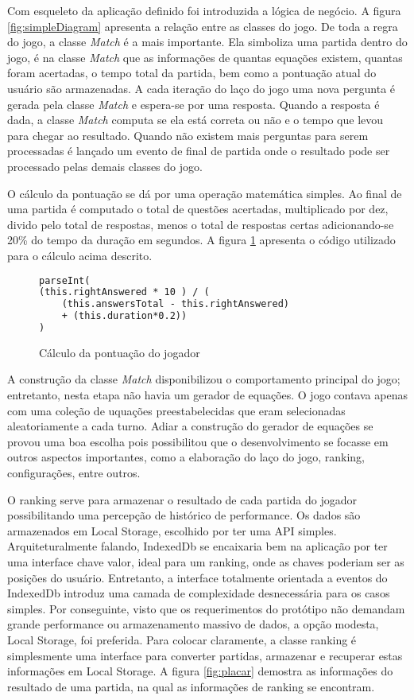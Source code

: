 Com esqueleto da aplicação definido foi introduzida a lógica
de negócio. A figura \ref{fig:simpleDiagram} apresenta a
relação entre as classes do jogo. De toda a regra do jogo, a classe
\textit{Match} é a mais importante. Ela simboliza uma partida dentro
do jogo, é na classe \textit{Match} que as informações de quantas
equações existem, quantas foram acertadas, o tempo total da partida,
bem como a pontuação atual do usuário são armazenadas. A cada
iteração do laço do jogo uma nova pergunta é gerada pela classe
\textit{Match} e espera-se por uma resposta. Quando a resposta é dada,
a classe \textit{Match} computa se ela está correta ou não e
o tempo que levou para chegar ao resultado. Quando não existem mais
perguntas para serem processadas é lançado um evento de final de
partida onde o resultado pode ser processado pelas demais classes do
jogo.

O cálculo da pontuação se dá por uma operação matemática simples.
Ao final de uma partida é computado o total de questões acertadas,
multiplicado por dez, divido pelo total de respostas, menos o total de
respostas certas adicionando-se 20\% do tempo da duração em segundos.
A figura \ref{fig:punctuationCalculation} apresenta o código utilizado
para o cálculo acima descrito.

\begin{figure}[H]
\centering
\begin{lstlisting}[language=html,frame=single]
parseInt(
(this.rightAnswered * 10 ) / (
    (this.answersTotal - this.rightAnswered) 
    + (this.duration*0.2))
)
\end{lstlisting}
\caption{Cálculo da pontuação do jogador}
\label{fig:punctuationCalculation}
\end{figure}

A construção da classe \textit{Match} disponibilizou o comportamento
principal do jogo; entretanto, nesta etapa não havia um gerador de
equações. O jogo contava apenas com uma coleção de uquações
preestabelecidas que eram selecionadas aleatoriamente a cada turno.
Adiar a construção do gerador de equações se provou uma boa
escolha pois possibilitou que o desenvolvimento se focasse em outros
aspectos importantes, como a elaboração do laço do jogo, ranking,
configurações, entre outros.

O ranking serve para armazenar o resultado de cada partida do jogador
possibilitando uma percepção de histórico de performance. Os
dados são armazenados em Local Storage, escolhido por ter uma API
simples. Arquiteturalmente falando, IndexedDb se encaixaria bem na
aplicação por ter uma interface chave valor, ideal para um ranking,
onde as chaves poderiam ser as posições do usuário. Entretanto, a
interface totalmente orientada a eventos do IndexedDb introduz uma
camada de complexidade desnecessária para os casos simples. Por
conseguinte, visto que os requerimentos do protótipo não demandam
grande performance ou armazenamento massivo de dados, a opção
modesta, Local Storage, foi preferida. Para colocar claramente, a
classe ranking é simplesmente uma interface para converter partidas,
armazenar e recuperar estas informações em Local Storage. A figura
\ref{fig:placar} demostra as informações do resultado de uma partida,
na qual as informações de ranking se encontram.

